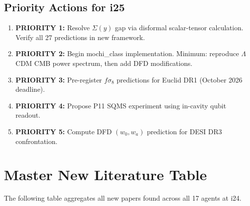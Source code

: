 \documentclass[11pt]{article}
\newcommand{\LCDM}{$\Lambda$CDM}
\begin{document}
\subsection{Priority Actions for i25}

\begin{enumerate}
  \item \textbf{PRIORITY 1:} Resolve $\Sigma(y)$ gap via disformal
    scalar-tensor calculation. Verify all 27 predictions in new framework.
  \item \textbf{PRIORITY 2:} Begin mochi\_class implementation. Minimum:
    reproduce \LCDM{} CMB power spectrum, then add DFD modifications.
  \item \textbf{PRIORITY 3:} Pre-register $f\sigma_8$ predictions for
    Euclid DR1 (October 2026 deadline).
  \item \textbf{PRIORITY 4:} Propose P11 SQMS experiment using in-cavity
    qubit readout.
  \item \textbf{PRIORITY 5:} Compute DFD $(w_0, w_a)$ prediction for
    DESI DR3 confrontation.
\end{enumerate}

\section{Master New Literature Table}

The following table aggregates all new papers found across all 17 agents
at i24.
\end{document}
